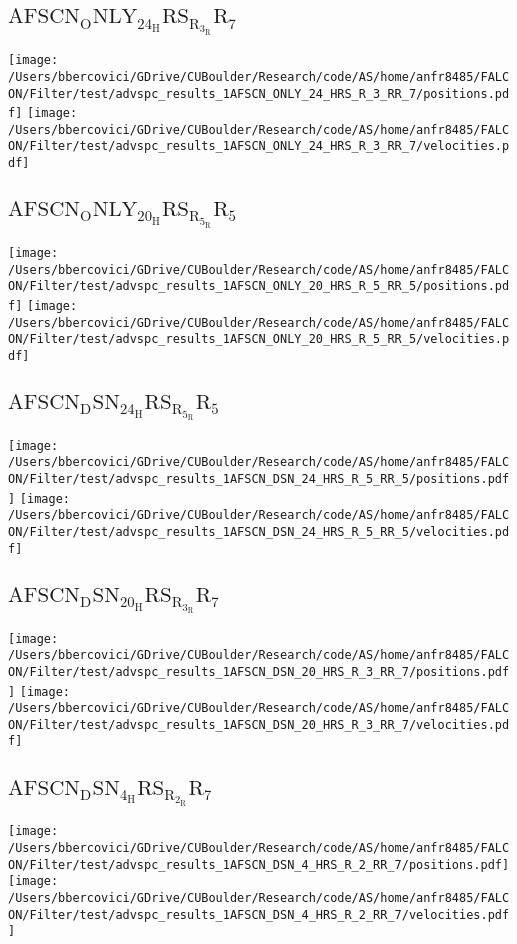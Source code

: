 \subsection{$\mathrm{AFSCN_ONLY_24_HRS_R_3_RR_7}$}
\texttt{[image: /Users/bbercovici/GDrive/CUBoulder/Research/code/AS/home/anfr8485/FALCON/Filter/test/advspc\_results\_1AFSCN\_ONLY\_24\_HRS\_R\_3\_RR\_7/positions.pdf]}
\texttt{[image: /Users/bbercovici/GDrive/CUBoulder/Research/code/AS/home/anfr8485/FALCON/Filter/test/advspc\_results\_1AFSCN\_ONLY\_24\_HRS\_R\_3\_RR\_7/velocities.pdf]}
\subsection{$\mathrm{AFSCN_ONLY_20_HRS_R_5_RR_5}$}
\texttt{[image: /Users/bbercovici/GDrive/CUBoulder/Research/code/AS/home/anfr8485/FALCON/Filter/test/advspc\_results\_1AFSCN\_ONLY\_20\_HRS\_R\_5\_RR\_5/positions.pdf]}
\texttt{[image: /Users/bbercovici/GDrive/CUBoulder/Research/code/AS/home/anfr8485/FALCON/Filter/test/advspc\_results\_1AFSCN\_ONLY\_20\_HRS\_R\_5\_RR\_5/velocities.pdf]}
\subsection{$\mathrm{AFSCN_DSN_24_HRS_R_5_RR_5}$}
\texttt{[image: /Users/bbercovici/GDrive/CUBoulder/Research/code/AS/home/anfr8485/FALCON/Filter/test/advspc\_results\_1AFSCN\_DSN\_24\_HRS\_R\_5\_RR\_5/positions.pdf]}
\texttt{[image: /Users/bbercovici/GDrive/CUBoulder/Research/code/AS/home/anfr8485/FALCON/Filter/test/advspc\_results\_1AFSCN\_DSN\_24\_HRS\_R\_5\_RR\_5/velocities.pdf]}
\subsection{$\mathrm{AFSCN_DSN_20_HRS_R_3_RR_7}$}
\texttt{[image: /Users/bbercovici/GDrive/CUBoulder/Research/code/AS/home/anfr8485/FALCON/Filter/test/advspc\_results\_1AFSCN\_DSN\_20\_HRS\_R\_3\_RR\_7/positions.pdf]}
\texttt{[image: /Users/bbercovici/GDrive/CUBoulder/Research/code/AS/home/anfr8485/FALCON/Filter/test/advspc\_results\_1AFSCN\_DSN\_20\_HRS\_R\_3\_RR\_7/velocities.pdf]}
\subsection{$\mathrm{AFSCN_DSN_4_HRS_R_2_RR_7}$}
\texttt{[image: /Users/bbercovici/GDrive/CUBoulder/Research/code/AS/home/anfr8485/FALCON/Filter/test/advspc\_results\_1AFSCN\_DSN\_4\_HRS\_R\_2\_RR\_7/positions.pdf]}
\texttt{[image: /Users/bbercovici/GDrive/CUBoulder/Research/code/AS/home/anfr8485/FALCON/Filter/test/advspc\_results\_1AFSCN\_DSN\_4\_HRS\_R\_2\_RR\_7/velocities.pdf]}
